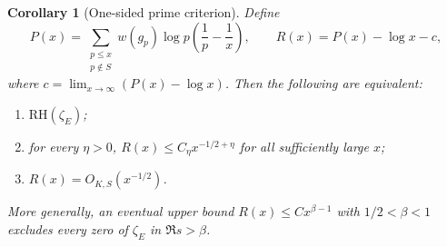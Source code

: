 \documentclass[11pt]{article}
\newtheorem{corollary}[theorem]{Corollary}
\theoremstyle{remark}\newtheorem{remark}[theorem]{Remark}
\newcommand{\RH}{\mathrm{RH}}
\begin{document}
\begin{corollary}[One-sided prime criterion]\label{cor:prime}
Define
\[
 P(x)=\sum_{\substack{p\le x\\p\notin S}} w(g_p)\log p
             \left(\frac1p-\frac1x\right),\qquad
 R(x)=P(x)-\log x-c,
\]
where $c=\lim_{x\to\infty}(P(x)-\log x)$. Then the following are equivalent:
\begin{enumerate}[label=\textup{(\roman*)},nosep]
\item $\RH(\zeta_E)$;
\item for every $\eta>0$, $R(x)\le C_\eta x^{-1/2+\eta}$ for all sufficiently
large $x$;
\item $R(x)=O_{K,S}(x^{-1/2})$.
\end{enumerate}
More generally, an eventual upper bound $R(x)\le Cx^{\beta-1}$ with
$1/2<\beta<1$ excludes every zero of $\zeta_E$ in $\Re s>\beta$.
\end{corollary}
\end{document}
